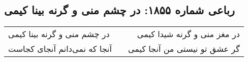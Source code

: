 \begin{center}
\section*{رباعی شماره ۱۸۵۵: در چشم منی و گرنه بینا کیمی}
\label{sec:1855}
\begin{longtable}{l p{0.5cm} r}
در چشم منی و گرنه بینا کیمی
&&
در مغز منی و گرنه شیدا کیمی
\\
آنجا که نمی‌دانم آنجای کجاست
&&
گر عشق تو نیستی من آنجا کیمی
\\
\end{longtable}
\end{center}
